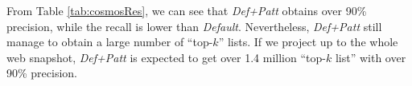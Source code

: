 From Table \ref{tab:cosmosRes}, we can see that {\em Def+Patt}
obtains over 90\% precision,
while the recall is lower than {\em Default}. Nevertheless,
{\em Def+Patt} still manage to obtain a large number of ``top-$k$'' lists.
If we project up to the whole web snapshot,
{\em Def+Patt} is expected to get over 1.4 million
``top-$k$ list'' with over 90\% precision.
%
%
%
%
%
%
%
%
%
